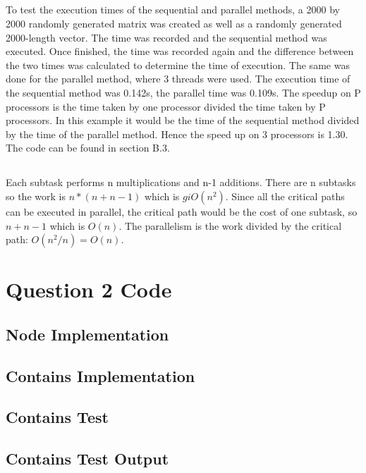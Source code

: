 \documentclass[11pt]{article}
\begin{document}
\subsection{}
To test the execution times of the sequential and parallel methods, a 2000 by 2000 randomly generated matrix was created as well as a 
randomly generated 2000-length vector. The time was recorded and the sequential method was executed. Once finished, the time was 
recorded again and the difference between the two times was calculated to determine the time of execution. The same was done for the 
parallel method, where 3 threads were used. The execution time of the sequential method was 0.142s, the parallel time was 0.109s. The 
speedup on P processors is the time taken by one processor divided the time taken by P processors. In this example it would be the time 
of the sequential method divided by the time of the parallel method. Hence the speed up on 3 processors is 1.30. The code can be found 
in section B.3.

\subsection{}
Each subtask performs n multiplications and n-1 additions. There are n subtasks so the work is $n*(n+n-1)$ which is $giO(n^2)$. Since all 
the critical paths can be executed in parallel, the critical path would be the cost of one subtask, so $n+n-1$ which is $O(n)$. The 
parallelism is the work divided by the critical path: $O(n^2/n) = O(n)$.

\appendix
\section{Question 2 Code}
\subsection{Node Implementation}

\subsection{Contains Implementation}

\subsection{Contains Test}

\subsection{Contains Test Output}

\end{document}
